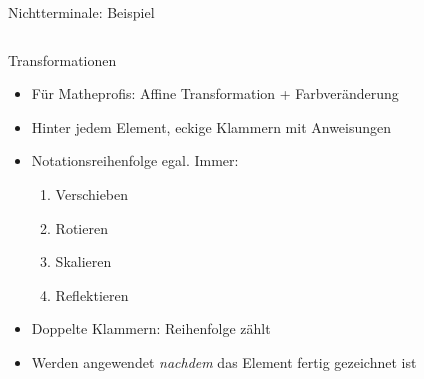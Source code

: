 \documentclass{beamer}
\theoremstyle{example}
\begin{document}
\begin{frame}[fragile]{Nichtterminale: Beispiel}
\begin{columns}
  \column{4cm}
  \begin{center}
  \end{center}
\end{columns}
\end{frame}

\begin{frame}{Transformationen}
  \begin{itemize}
  \item Für Matheprofis: Affine Transformation + Farbveränderung\pause
  \item Hinter jedem Element, eckige Klammern mit Anweisungen\pause
  \item Notationsreihenfolge egal. Immer:
    \begin{enumerate}
    \item Verschieben
    \item Rotieren
    \item Skalieren
    \item Reflektieren
    \end{enumerate}\pause
  \item Doppelte Klammern: Reihenfolge zählt\pause
  \item Werden angewendet \emph{nachdem} das Element fertig gezeichnet ist
  \end{itemize}
\end{frame}
\end{document}
